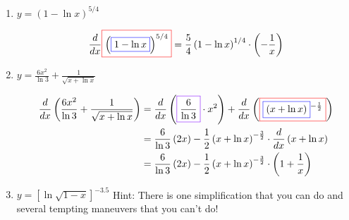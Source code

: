 \documentclass{article}
\begin{document}
\begin{enumerate}
\begin{enumerate}[topsep=0pt]
  \item 
    \begin{problem}[\vfill\newpage]
      $y = (1 - \ln x)^{5/4}$
    \end{problem}

    \begin{solution}
      \begin{align*}
        \frac{d}{dx} \fcolorbox{red}{white}{$\left(
            \fcolorbox{blue}{white}{$1-\ln x$} \right)^{5/4}$} =
        \frac{5}{4}\left(1-\ln x\right)^{1/4} \cdot \left( -\frac{1}{x}
        \right)
      \end{align*}
    \end{solution}

  \item
    \begin{problem}[\vfill]
     $\displaystyle y = \frac{6 x^2}{\ln 3} +
        \frac{1}{\sqrt{x+ \ln x}}$ 
    \end{problem}

    \begin{solution}
      \begin{align*}
        \frac{d}{dx}\left( \frac{6 x^2}{\ln 3} +
        \frac{1}{\sqrt{x+ \ln x}} \right) = {} & \frac{d}{dx}
        \left(\fcolorbox{purple}{white}{$\displaystyle \frac{6}{\ln
              3}$}\cdot x^ { 2} \right)+ \frac{d}{dx}
        \left(\fcolorbox{red}{white}{$\displaystyle
            \fcolorbox{blue}{white}{$\displaystyle (x+ \ln x)$}^ {
              -\frac{1}{2}} $}\right) \\ 
        = {} & \frac{6}{\ln 3} \left(2x
        \right)-\frac{1}{2} \left(x+ \ln x\right)^ { -\frac{3}{2}}
        \cdot \frac{d}{dx}\left(x+ \ln x\right) \\ 
        = {} & \frac{6}{\ln 3} \left(2x
        \right)-\frac{1}{2} \left(x+ \ln x\right)^ { -\frac{3}{2}}
        \cdot \left(1+ \frac{1}{x}\right) 
      \end{align*}
    \end{solution}

  \item
    \begin{problem}[\vfill\newpage]
      $y = \left[ \ln \sqrt{1 - x} \right]^{-3.5}$ Hint: There is one simplification that you can do and several tempting maneuvers that you can't do!
    \end{problem}


\end{enumerate}
\end{enumerate}
\end{document}
